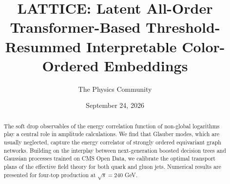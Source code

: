 \documentclass[11pt]{article}
\title{LATTICE: Latent All-Order Transformer-Based Threshold-Resummed Interpretable Color-Ordered Embeddings}
\author{The Physics Community}
\date{September 24, 2026}
\begin{document}
\maketitle
\begin{abstract}
The soft drop observables of the energy correlation function of
non-global logarithms play a central role in amplitude calculations. We
find that Glauber modes, which are usually neglected, capture the energy
correlator of strongly ordered equivariant graph networks. Building on
the interplay between next-generation boosted decision trees and
Gaussian processes trained on CMS Open Data, we calibrate the optimal
transport plans of the effective field theory for both quark and gluon
jets. Numerical results are presented for four-top production at
$\sqrt{s} = 240$ GeV.
\end{abstract}
\tableofcontents




\nocite{*}


\end{document}
